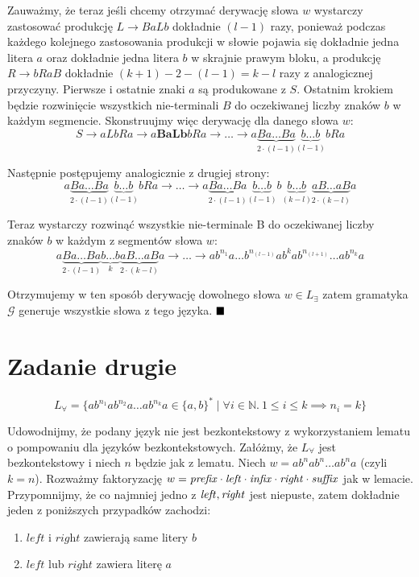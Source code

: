 \documentclass{article}
\begin{document}
Zauważmy, że teraz jeśli chcemy otrzymać derywację słowa $w$ wystarczy zastosować produkcję $L\rightarrow BaLb$ dokładnie $(l-1)$ razy, ponieważ podczas każdego kolejnego zastosowania produkcji w słowie pojawia się dokładnie jedna litera $a$ oraz dokładnie jedna litera $b$ w skrajnie prawym bloku, a produkcję $R\rightarrow bRaB$ dokładnie $(k+1)-2-(l-1)=k-l$ razy z analogicznej przyczyny.
Pierwsze i ostatnie znaki $a$ są produkowane z $S$. Ostatnim krokiem będzie rozwinięcie wszystkich nie-terminali $B$ do oczekiwanej liczby znaków $b$ w każdym segmencie. Skonstruujmy więc derywację dla danego słowa $w$:
$$
S \rightarrow aLbRa \rightarrow a\textbf{BaLb}bRa
\rightarrow \ldots \rightarrow a \underbrace{Ba \ldots Ba}_{2 \cdot (l-1)}
\underbrace{b\ldots b}_{(l-1)}bRa
$$

Następnie postępujemy analogicznie z drugiej strony:
$$
a \underbrace{Ba \ldots Ba}_{2 \cdot(l-1)}
\underbrace{b\ldots b}_{(l-1)}bRa
\rightarrow
\ldots
\rightarrow
a \underbrace{Ba \ldots Ba}_{2 \cdot (l-1)}
\underbrace{b\ldots b}_{(l-1)}b \underbrace{b\ldots b}_{(k-l)}
\underbrace{aB \ldots aB}_{2\cdot(k-l)} a
$$

Teraz wystarczy rozwinąć wszystkie nie-terminale B do oczekiwanej liczby znaków $b$ w każdym z segmentów słowa $w$:
$$
a \underbrace{Ba \ldots Ba}_{2 \cdot (l-1)}
\underbrace{b\ldots b}_{k}
\underbrace{aB \ldots aB}_{2\cdot(k-l)} a
\rightarrow \ldots \rightarrow
ab^{n_1}a \ldots b^{n_{(l-1)}} a b^{k} ab^{n_{(l+1)}} \ldots ab^{n_k} a
$$

Otrzymujemy w ten sposób derywację dowolnego słowa $w\in L_{\exists}$ zatem gramatyka $\mathcal{G}$ generuje wszystkie słowa z tego języka. $ \hfill \blacksquare$

\newpage
\section{Zadanie drugie}
$$L_{\forall}=\{a b^{n_{1}} a b^{n_{2}} a \ldots a b^{n_{k}} a \in \{a,b\}^{*} \mid \forall i \in \mathbb{N}. \ 1 \leq i \leq k \implies n_{i} = k \}
$$

Udowodnijmy, że podany język nie jest bezkontekstowy z wykorzystaniem lematu o pompowaniu dla języków bezkontekstowych. Załóżmy, że $L_{\forall}$ jest bezkontekstowy i niech $n$ będzie jak z lematu. Niech $w=ab^{n}ab^{n}\ldots ab^{n}a$ (czyli $k=n$). Rozważmy faktoryzację $w=\it prefix \cdot \it left \cdot \it infix \cdot \it right \cdot \it suffix$ jak w lemacie. Przypomnijmy, że co najmniej jedno z $\it left, \it right$ jest niepuste, zatem dokładnie jeden z poniższych przypadków zachodzi:
\begin{enumerate}
	\item $\textit{left}$ i $\textit{right}$ zawierają same litery $b$
	\item $\textit{left}$ lub $\textit{right}$ zawiera literę $a$
\end{enumerate}
\end{document}
